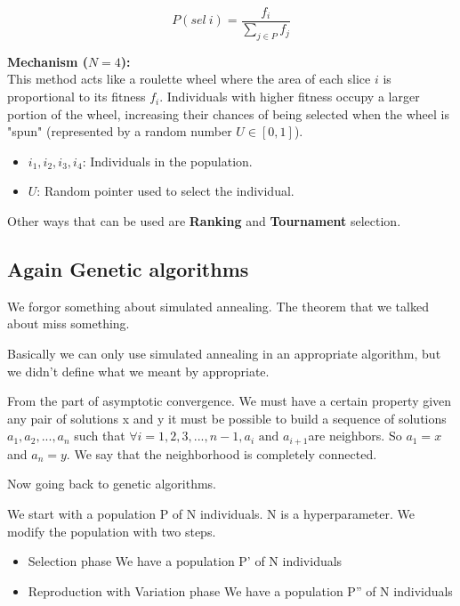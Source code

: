 \[
P(sel \ i) = \frac{f_i}{\sum_{j \in P} f_j}
\]

\vspace{10pt}

\noindent
\textbf{Mechanism ($N = 4$):} \\
This method acts like a roulette wheel where the area of each slice $i$ is proportional to its fitness $f_i$. 
Individuals with higher fitness occupy a larger portion of the wheel, increasing their chances of being selected when the wheel is "spun" (represented by a random number $U \in [0, 1]$).

\begin{itemize}
    \item $i_1, i_2, i_3, i_4$: Individuals in the population.
    \item $U$: Random pointer used to select the individual.
\end{itemize}

Other ways that can be used are \textbf{Ranking} and \textbf{Tournament} selection.




\subsection{Again Genetic algorithms}

We forgor something about simulated annealing. The theorem that we talked about miss something.

Basically we can only use simulated annealing in an appropriate algorithm, but we didn't define what we meant by appropriate. 

\vspace{10pt}

From the part of asymptotic convergence. We must have a certain property \ra given any pair of solutions x and y it must be possible to build a sequence of solutions $a_1, a_2,..., a_n$ such that $\forall i = 1,2,3,...,n-1, a_i \text{ and } a_{i+1} $are neighbors. So $a_1=x$ and $a_n=y$. We say that the neighborhood is completely connected. 



\vspace{10pt}

Now going back to genetic algorithms.

We start with a population P of N individuals. N is a hyperparameter. We modify the population with two steps.
\begin{itemize}
    \item Selection phase \ra We have a population P' of N individuals
    \item Reproduction with Variation phase \ra We have a population P'' of N individuals
\end{itemize}

